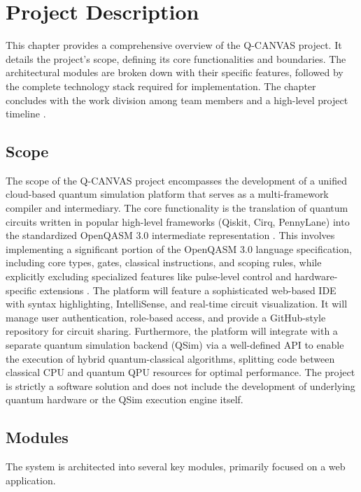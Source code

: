 \chapter{Project Description}
\label{ch:description}

This chapter provides a comprehensive overview of the Q-CANVAS project. It details the project's scope, defining its core functionalities and boundaries. The architectural modules are broken down with their specific features, followed by the complete technology stack required for implementation. The chapter concludes with the work division among team members and a high-level project timeline \cite{mckay2018, barenco1995}.

\section{Scope}
The scope of the Q-CANVAS project encompasses the development of a unified cloud-based quantum simulation platform that serves as a multi-framework compiler and intermediary. The core functionality is the translation of quantum circuits written in popular high-level frameworks (Qiskit, Cirq, PennyLane) into the standardized OpenQASM 3.0 intermediate representation \cite{mckay2018}. This involves implementing a significant portion of the OpenQASM 3.0 language specification, including core types, gates, classical instructions, and scoping rules, while explicitly excluding specialized features like pulse-level control and hardware-specific extensions \cite{alexander2020, nguyen2020}. The platform will feature a sophisticated web-based IDE with syntax highlighting, IntelliSense, and real-time circuit visualization. It will manage user authentication, role-based access, and provide a GitHub-style repository for circuit sharing. Furthermore, the platform will integrate with a separate quantum simulation backend (QSim) via a well-defined API to enable the execution of hybrid quantum-classical algorithms, splitting code between classical CPU and quantum QPU resources for optimal performance. The project is strictly a software solution and does not include the development of underlying quantum hardware or the QSim execution engine itself.

\section{Modules}
The system is architected into several key modules, primarily focused on a web application.

